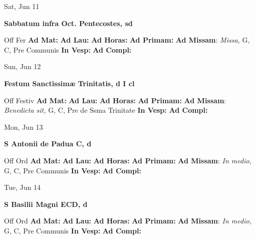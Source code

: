 \documentclass[10pt]{article}
\begin{document}
\begin{minipage}{3.5in}
\vspace{2em}\begin{center}
Sat, Jun 11
\end{center}\textbf{ \large Sabbatum infra Oct. Pentecostes, \textnormal{\normalsize sd}}
\begin{justify}
Off Fer
\textbf{Ad Mat: }
\textbf{Ad Lau: }
\textbf{Ad Horas: }
\textbf{Ad Primam: }
\textbf{Ad Missam}: \textit{Missa,} G, C, Pre Communis
\textbf{In Vesp: }
\textbf{Ad Compl: }\end{justify}
\end{minipage}



\begin{minipage}{3.5in}
\vspace{2em}\begin{center}
Sun, Jun 12
\end{center}\textbf{ \large Festum Sanctissimæ Trinitatis, \textnormal{\normalsize d I cl}}
\begin{justify}
Off Festiv
\textbf{Ad Mat: }
\textbf{Ad Lau: }
\textbf{Ad Horas: }
\textbf{Ad Primam: }
\textbf{Ad Missam}: \textit{Benedicta sit,} G, C, Pre de Ssma Trinitate
\textbf{In Vesp: }
\textbf{Ad Compl: }\end{justify}
\end{minipage}



\begin{minipage}{3.5in}
\vspace{2em}\begin{center}
Mon, Jun 13
\end{center}\textbf{ \large S Antonii de Padua C, \textnormal{\normalsize d}}
\begin{justify}
Off Ord
\textbf{Ad Mat: }
\textbf{Ad Lau: }
\textbf{Ad Horas: }
\textbf{Ad Primam: }
\textbf{Ad Missam}: \textit{In medio,} G, C, Pre Communis
\textbf{In Vesp: }
\textbf{Ad Compl: }\end{justify}
\end{minipage}



\begin{minipage}{3.5in}
\vspace{2em}\begin{center}
Tue, Jun 14
\end{center}\textbf{ \large S Basilii Magni ECD, \textnormal{\normalsize d}}
\begin{justify}
Off Ord
\textbf{Ad Mat: }
\textbf{Ad Lau: }
\textbf{Ad Horas: }
\textbf{Ad Primam: }
\textbf{Ad Missam}: \textit{In medio,} G, C, Pre Communis
\textbf{In Vesp: }
\textbf{Ad Compl: }\end{justify}
\end{minipage}
\end{document}

